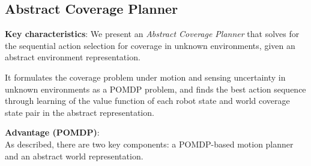 \documentclass{article}
\newcommand{\ph}[1]{{\textbf{#1}:}} %
\begin{document}
\subsection{Abstract Coverage Planner} 


\ph{Key characteristics} 
%
We present an \textit{Abstract Coverage Planner} that solves for the sequential action selection for coverage in unknown environments, given an abstract environment representation. %

It formulates the coverage problem under motion and sensing uncertainty in unknown environments as a POMDP problem, and finds the best action sequence through learning of the value function of each robot state and world coverage state pair in the abstract representation.

\ph{Advantage (POMDP)} \\
%
As described, there are two key components: a POMDP-based motion planner and an abstract world representation.
\end{document}
